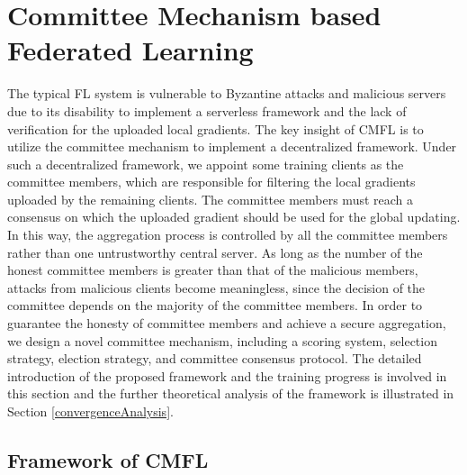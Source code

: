 \documentclass[10pt,journal,compsoc]{IEEEtran}
\begin{document}
\section{Committee Mechanism based Federated Learning}
\label{CMFL}

The typical FL system is vulnerable to Byzantine attacks and malicious servers due to its disability to implement a serverless framework and the lack of verification for the uploaded local gradients. The key insight of CMFL is to utilize the committee mechanism to implement a decentralized framework. Under such a decentralized framework, we appoint some training clients as the committee members, which are responsible for filtering the local gradients uploaded by the remaining clients. The committee members must reach a consensus on which the uploaded gradient should be used for the global updating. In this way, the aggregation process is controlled by all the committee members rather than one untrustworthy central server. As long as the number of the honest committee members is greater than that of the malicious members, attacks from malicious clients become meaningless, since the decision of the committee depends on the majority of the committee members. In order to guarantee the honesty of committee members and achieve a secure aggregation, we design a novel committee mechanism, including a scoring system, selection strategy, election strategy, and committee consensus protocol. The detailed introduction of the proposed framework and the training progress is involved in this section and the further theoretical analysis of the framework is illustrated in Section \ref{convergenceAnalysis}.




\subsection{Framework of CMFL}\label{FrameworkOfCMFL}
\end{document}
